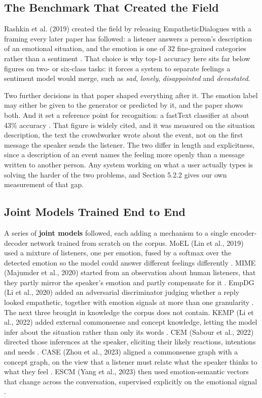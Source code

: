 \subsection{The Benchmark That Created the Field}
\label{sec:2.2.1}

Rashkin et al. (2019) created the field by releasing EmpatheticDialogues with a framing every later paper has followed: a listener answers a person's description of an emotional situation, and the emotion is one of 32 fine-grained categories rather than a sentiment \cite{rashkin2019}. That choice is why top-1 accuracy here sits far below figures on two- or six-class tasks: it forces a system to separate feelings a sentiment model would merge, such as \textit{sad}, \textit{lonely}, \textit{disappointed }and \textit{devastated}.

Two further decisions in that paper shaped everything after it. The emotion label may either be given to the generator or predicted by it, and the paper shows both. And it set a reference point for recognition: a fastText classifier at about 43\% accuracy \cite{rashkin2019}. That figure is widely cited, and it was measured on the situation description, the text the crowdworker wrote about the event, not on the first message the speaker sends the listener. The two differ in length and explicitness, since a description of an event names the feeling more openly than a message written to another person. Any system working on what a user actually types is solving the harder of the two problems, and Section 5.2.2 gives our own measurement of that gap.

\subsection{Joint Models Trained End to End}
\label{sec:2.2.2}

A series of \textbf{joint models} followed, each adding a mechanism to a single encoder-decoder network trained from scratch on the corpus. MoEL (Lin et al., 2019) used a mixture of listeners, one per emotion, fused by a softmax over the detected emotion so the model could answer different feelings differently \cite{lin2019moel}. MIME (Majumder et al., 2020) started from an observation about human listeners, that they partly mirror the speaker's emotion and partly compensate for it \cite{majumder2020mime}. EmpDG (Li et al., 2020) added an adversarial discriminator judging whether a reply looked empathetic, together with emotion signals at more than one granularity \cite{li2020empdg}. The next three brought in knowledge the corpus does not contain. KEMP (Li et al., 2022) added external commonsense and concept knowledge, letting the model infer about the situation rather than only its words \cite{li2022kemp}. CEM (Sabour et al., 2022) directed those inferences at the speaker, eliciting their likely reactions, intentions and needs \cite{sabour2022cem}. CASE (Zhou et al., 2023) aligned a commonsense graph with a concept graph, on the view that a listener must relate what the speaker thinks to what they feel \cite{zhou2023case}. ESCM (Yang et al., 2023) then used emotion-semantic vectors that change across the conversation, supervised explicitly on the emotional signal \cite{yang2023escm}.

